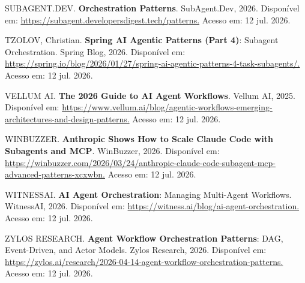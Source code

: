 \documentclass[12pt,a4paper]{article}
\begin{document}
SUBAGENT.DEV. \textbf{Orchestration Patterns}. SubAgent.Dev, 2026. Disponível em: \url{https://subagent.developersdigest.tech/patterns.} Acesso em: 12 jul. 2026.

TZOLOV, Christian. \textbf{Spring AI Agentic Patterns (Part 4)}: Subagent Orchestration. Spring Blog, 2026. Disponível em: \url{https://spring.io/blog/2026/01/27/spring-ai-agentic-patterns-4-task-subagents/.} Acesso em: 12 jul. 2026.

VELLUM AI. \textbf{The 2026 Guide to AI Agent Workflows}. Vellum AI, 2025. Disponível em: \url{https://www.vellum.ai/blog/agentic-workflows-emerging-architectures-and-design-patterns.} Acesso em: 12 jul. 2026.

WINBUZZER. \textbf{Anthropic Shows How to Scale Claude Code with Subagents and MCP}. WinBuzzer, 2026. Disponível em: \url{https://winbuzzer.com/2026/03/24/anthropic-claude-code-subagent-mcp-advanced-patterns-xcxwbn.} Acesso em: 12 jul. 2026.

WITNESSAI. \textbf{AI Agent Orchestration}: Managing Multi-Agent Workflows. WitnessAI, 2026. Disponível em: \url{https://witness.ai/blog/ai-agent-orchestration.} Acesso em: 12 jul. 2026.

ZYLOS RESEARCH. \textbf{Agent Workflow Orchestration Patterns}: DAG, Event-Driven, and Actor Models. Zylos Research, 2026. Disponível em: \url{https://zylos.ai/research/2026-04-14-agent-workflow-orchestration-patterns.} Acesso em: 12 jul. 2026.
\end{document}
